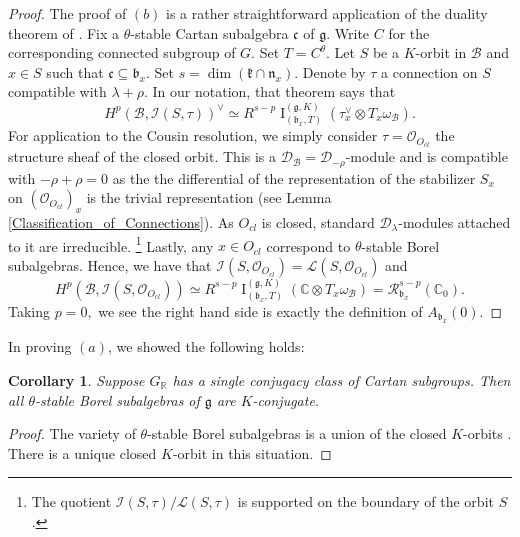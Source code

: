\documentclass[letterpaper,twosided,11pt]{article}
\theoremstyle{plain}
\newtheorem{corollary}[theorem]{Corollary}
\theoremstyle{definition}
\theoremstyle{remark}
\newcommand{\C}{\mathbb{C}}
\newcommand{\R}{\mathbb{R}}
\newcommand{\tensor}{\otimes}
\newcommand{\lie}[1]{\mathfrak{#1}}
\begin{document}
\begin{proof}
    The proof of $ (b) $ is a rather straightforward application of the
    duality theorem of
    \cite{Hecht1987}.  Fix a $ \theta $-stable Cartan subalgebra $ \lie{c}
    $ of $ \lie{g}. $ Write $ C $ for the corresponding connected
    subgroup of $ G. $ Set $ T=C^\theta. $ Let $ S $ be a $ K $-orbit in
    $ \mathcal{B} $ and $ x\in S $ such that $ \lie{c}\subseteq \lie{b}_x.
    $ Set $ s=\dim( \lie{k}\cap \lie{n}_x). $ Denote by $ \tau $ a
    connection on $ S $ compatible with $ \lambda+\rho. $ In our
    notation, that theorem says that
    \[
        H^p(\mathcal{B},\mathcal{I}(S,\tau))^\vee\simeq R^{s-p}
        \operatorname{I}
        _{(\lie{b}_x,T)}^{(\lie{g},K)} (\tau_x^\vee\tensor T_x\omega_{\mathcal
        {B}}).
    \]
    For application to the Cousin resolution, we simply consider $ \tau=\mathcal
    {O}_{O_{cl}} $ the structure sheaf of the closed orbit.  This is a $
    \mathcal{D}_\mathcal{B}=\mathcal{D}_{-\rho} $-module and is
    compatible with $ -\rho+\rho=0 $ as the the differential of the
    representation of the stabilizer $ S_x $ on $ (\mathcal{O}_{O_{cl}})_x
    $ is the trivial representation (see Lemma \ref{Classification_of_Connections}).
    As $ O_{cl} $ is closed, standard $ \mathcal{D}_\lambda $-modules
    attached to it are irreducible.%
    \footnote{The quotient $ \mathcal{I}(S,\tau)/\mathcal{L}(S,\tau) $
    is supported on the boundary of the orbit $ S $.} Lastly, any $ x\in
    O_{cl} $ correspond to $ \theta $-stable Borel subalgebras.  Hence,
    we have that $ \mathcal{I}(S,\mathcal{O}_{O_{cl}})=\mathcal{L}(S,\mathcal
    {O}_{O_{cl}}) $ and
    \[
        H^p(\mathcal{B},\mathcal{I}(S,\mathcal{O}_{O_{cl}}))\simeq R^{s-p}
        \operatorname{I}
        _{(\lie{b}_x,T)}^{(\lie{g},K)} (\C\tensor T_x\omega_{\mathcal{B}})
        = \mathcal{R}_{\lie{b}_x}^{s-p}(\C_0).
    \]
    Taking $ p=0, $ we see the right hand side is exactly the definition
    of $ A_{\lie{b}_x}(0). $

\end{proof}

In proving $ (a) $, we showed the following holds:
\begin{corollary}
    Suppose $ G_\R $ has a single conjugacy class of Cartan subgroups.
    Then all $ \theta $-stable Borel subalgebras of $ \lie{g} $ are $ K $-conjugate.
\end{corollary}
\begin{proof}
    The variety of $ \theta $-stable Borel subalgebras is a union of the
    closed $ K $-orbits
    \cite[Lemma 6.16]{Hecht2022}.  There is a unique closed $ K $-orbit
    in this situation.
\end{proof}
\end{document}
